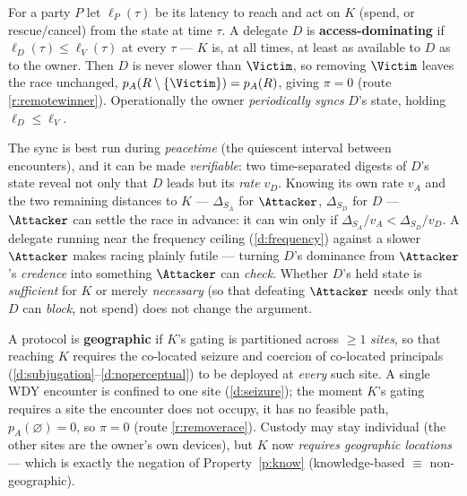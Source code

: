 \begin{definition}\label{def:dominating}
For a party $P$ let $\ell_P(\tau)$ be its latency to reach and act on $K$ (spend,
or rescue/cancel) from the state at time $\tau$. A delegate $D$ is
\textbf{access-dominating} if $\ell_D(\tau) \le \ell_V(\tau)$ at every $\tau$ ---
$K$ is, at all times, at least as available to $D$ as to the owner. Then $D$ is
never slower than $\Victim$, so removing $\Victim$ leaves the race unchanged,
$p_A(R\setminus\{\Victim\}) = p_A(R)$, giving $\pi = 0$ (route \ref{r:remotewinner}). Operationally
the owner \emph{periodically syncs} $D$'s state, holding $\ell_D \le \ell_V$.
\end{definition}

\begin{remark}\label{rem:verifiable-dominance}
The sync is best run during \emph{peacetime} (the quiescent interval between
encounters), and it can be made \emph{verifiable}: two time-separated digests of
$D$'s state reveal not only that $D$ leads but its \emph{rate} $v_D$. Knowing its
own rate $v_A$ and the two remaining distances to $K$ --- $\Delta_{S_A}$ for
$\Attacker$, $\Delta_{S_D}$ for $D$ --- $\Attacker$ can settle the race in advance:
it can win only if $\Delta_{S_A}/v_A < \Delta_{S_D}/v_D$. A delegate running near the frequency
ceiling (\ref{d:frequency}) against a slower $\Attacker$ makes racing plainly
futile --- turning $D$'s dominance from $\Attacker$'s \emph{credence} into something
$\Attacker$ can \emph{check}. Whether $D$'s held state is \emph{sufficient} for $K$
or merely \emph{necessary} (so that defeating $\Attacker$ needs only that $D$ can
\emph{block}, not spend) does not change the argument.
\end{remark}

\begin{definition}\label{def:geographic}
A protocol is \textbf{geographic} if $K$'s gating is partitioned across $\ge 1$
\emph{sites}, so that reaching $K$ requires the co-located seizure and coercion of
co-located principals (\ref{d:subjugation}--\ref{d:noperceptual}) to be deployed at
\emph{every} such site. A single WDY encounter is confined to one site
(\ref{d:seizure}); the moment $K$'s gating requires a site the encounter does not
occupy, it has no feasible path, $p_A(\varnothing) = 0$, so $\pi = 0$ (route
\ref{r:removerace}). Custody may stay individual (the other sites are the owner's own devices),
but $K$ now \emph{requires geographic locations} --- which is exactly the
negation of Property~\ref{p:know} (knowledge-based $\equiv$ non-geographic).
\end{definition}

